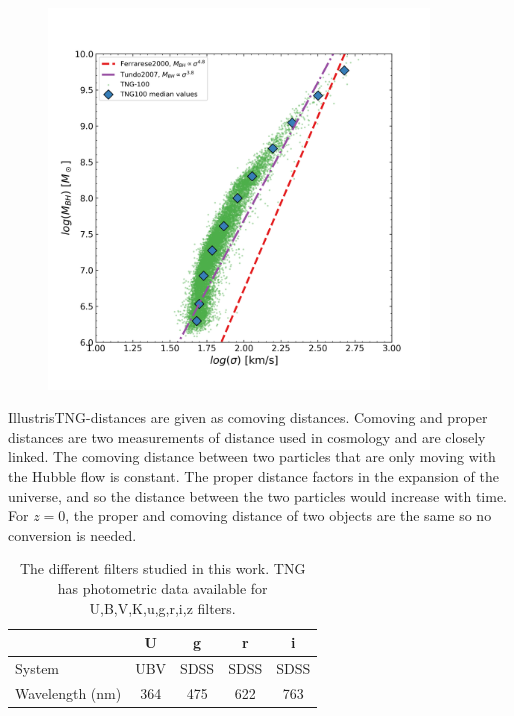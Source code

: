 \begin{figure}
    \centering
    \includegraphics[width=0.9\textwidth]{images/results_mass_BH_sigma.png}
    \caption{}
    \label{bh_res}
\end{figure}


IllustrisTNG-distances are given as comoving distances. Comoving and proper distances are two measurements of distance used in cosmology and are closely linked. The comoving distance between two particles that are only moving with the Hubble flow is constant. The proper distance factors in the expansion of the universe, and so the distance between the two particles would increase with time. For $z=0$, the proper and comoving distance of two objects are the same so no conversion is needed.



\begin{table}
\begin{center}
\caption{The different filters studied in this work. TNG has photometric data available for U,B,V,K,u,g,r,i,z filters.}
\label{filters}
\begin{tabular}{ l| c c c c } 
 \hline
 \hline
   & U & g & r & i \\
 \hline
 System  & UBV & SDSS & SDSS & SDSS \\
 Wavelength (nm) & 364 & 475 & 622 & 763 \\
 \hline
\end{tabular}
\end{center}
\end{table}